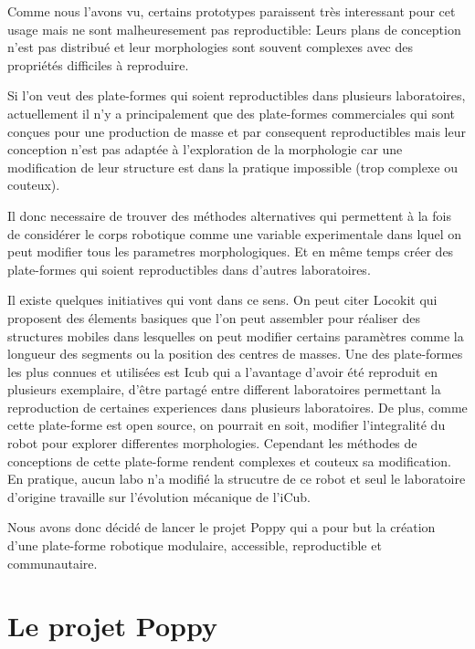 Comme nous l'avons vu, certains prototypes paraissent très interessant pour cet usage mais ne sont malheuresement pas reproductible: Leurs plans de conception n'est pas distribué et leur morphologies sont souvent complexes avec des propriétés difficiles à reproduire.

Si l'on veut des plate-formes qui soient reproductibles dans plusieurs laboratoires, actuellement il n'y a principalement que des plate-formes commerciales qui sont conçues pour une production de masse et par consequent reproductibles mais leur conception n'est pas adaptée à l'exploration de la morphologie car une modification de leur structure est dans la pratique impossible (trop complexe ou couteux).

Il donc necessaire de trouver des méthodes alternatives qui permettent à la fois de considérer le corps robotique comme une variable experimentale dans lquel on peut modifier tous les parametres morphologiques. Et en même temps créer des plate-formes qui soient reproductibles dans d'autres laboratoires.

Il existe quelques initiatives qui vont dans ce sens. On peut citer Locokit qui proposent des élements basiques que l'on peut assembler pour réaliser des structures mobiles dans lesquelles on peut modifier certains paramètres comme la longueur des segments ou la position des centres de masses.
Une des plate-formes les plus connues et utilisées est Icub qui a l'avantage d'avoir été reproduit en plusieurs exemplaire, d'être partagé entre different laboratoires permettant la reproduction de certaines experiences dans plusieurs laboratoires. De plus, comme cette plate-forme est open source, on pourrait en soit, modifier l'integralité du robot pour explorer differentes morphologies. Cependant les méthodes de conceptions de cette plate-forme rendent complexes et couteux sa modification. En pratique, aucun labo n'a modifié la strucutre de ce robot et seul le laboratoire d'origine travaille sur l'évolution mécanique de l'iCub.


Nous avons donc décidé de lancer le projet Poppy qui a pour but la création d'une plate-forme robotique modulaire, accessible, reproductible et communautaire.

\section*{Le projet Poppy}
\label{sec:Le projet Poppy}
